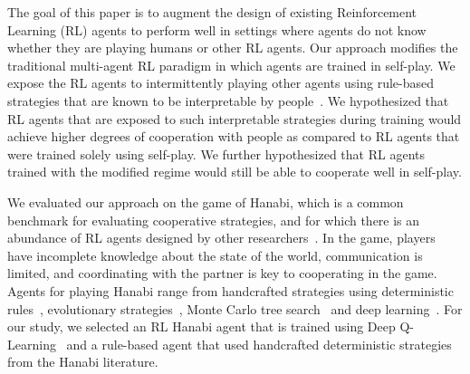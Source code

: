\documentclass[letterpaper]{article} %
\begin{document}
The goal of this paper is to
augment the design of existing    Reinforcement Learning (RL) agents to  perform well in settings where agents   do not know whether they are playing humans or other RL agents. %
Our approach modifies the traditional  multi-agent  RL  paradigm in which agents are  trained in self-play. We expose the RL agents to  intermittently playing other agents using   rule-based strategies that are known to be interpretable by people~\cite{lakkaraju2016interpretable}. We hypothesized that RL agents that are exposed to such interpretable strategies during training would achieve higher degrees of cooperation with people as compared to RL agents that were trained solely using self-play. We further hypothesized that RL agents trained with the modified regime would still be able to cooperate well in self-play.

We evaluated our approach on the game of Hanabi, which is a common benchmark for evaluating cooperative strategies, and for which there is an abundance of RL agents designed by other researchers~\cite{bard2020hanabi}.
  In the game, players have incomplete knowledge about  the state of the world,  communication is limited, and coordinating with the partner is key to cooperating in the game.  Agents for playing Hanabi range from handcrafted strategies
 using deterministic rules~\cite{osawa2015solving},     evolutionary strategies~\cite{canaan2018evolving},  Monte  Carlo tree search~\cite{walton2017evaluating,van2016aspects} and deep learning~\cite{bard2020hanabi}.
 For our study, we selected an RL  Hanabi agent that is trained  using Deep Q-Learning~\cite{hessel2018rainbow}
 and a rule-based agent that used handcrafted deterministic  strategies from the Hanabi literature.
\end{document}
